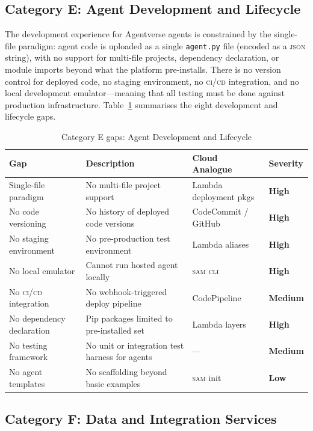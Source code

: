 \documentclass[twoside,11pt]{article}
\newcommand{\high}{\textcolor{red!70!black}{\textbf{High}}}
\newcommand{\medium}{\textcolor{orange!80!black}{\textbf{Medium}}}
\newcommand{\low}{\textcolor{green!50!black}{\textbf{Low}}}
\begin{document}
\subsection{Category E: Agent Development and Lifecycle}
\label{subsec:gap-dev}

The development experience for Agentverse agents is constrained by the
single-file paradigm: agent code is uploaded as a single \texttt{agent.py}
file (encoded as a \textsc{json} string), with no support for multi-file
projects, dependency declaration, or module imports beyond what the platform
pre-installs.  There is no version control for deployed code, no staging
environment, no \textsc{ci/cd} integration, and no local development
emulator---meaning that all testing must be done against production
infrastructure.  Table~\ref{tab:gap-dev} summarises the eight development
and lifecycle gaps.

\begin{table}[htbp]
\centering
\caption{Category E gaps: Agent Development and Lifecycle}
\label{tab:gap-dev}
\begin{tabular}{p{3.2cm} p{5.5cm} p{2.9cm} l}
\toprule
\textbf{Gap} & \textbf{Description} & \textbf{Cloud Analogue} &
\textbf{Severity} \\
\midrule
Single-file paradigm & No multi-file project support & Lambda deployment pkgs &
\high \\[4pt]
No code versioning & No history of deployed code versions & CodeCommit /
GitHub & \high \\[4pt]
No staging environment & No pre-production test environment & Lambda aliases &
\high \\[4pt]
No local emulator & Cannot run hosted agent locally & \textsc{sam cli} &
\high \\[4pt]
No \textsc{ci/cd} integration & No webhook-triggered deploy pipeline &
CodePipeline & \medium \\[4pt]
No dependency declaration & Pip packages limited to pre-installed set & Lambda
layers & \high \\[4pt]
No testing framework & No unit or integration test harness for agents & --- &
\medium \\[4pt]
No agent templates & No scaffolding beyond basic examples & \textsc{sam} init &
\low \\
\bottomrule
\end{tabular}
\end{table}

\subsection{Category F: Data and Integration Services}
\label{subsec:gap-data}
\end{document}
